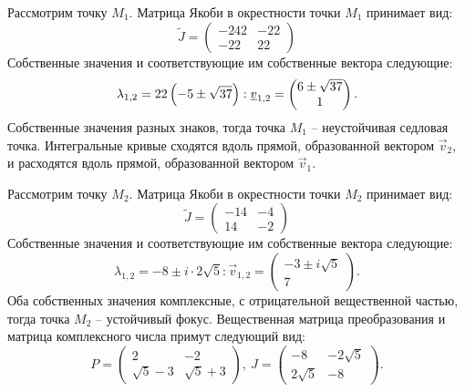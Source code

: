 \begin{enumerate}
				Рассмотрим точку $M_1$. Матрица Якоби в окрестности точки $M_1$ принимает вид:
				\[
					\tilde{J} = \begin{pmatrix}
						-242 & -22 \\
						-22 & 22
					\end{pmatrix}
				\]
				Собственные значения и соответствующие им собственные вектора следующие:
				\[ \lambda_{1, 2} = 22 \left( -5 \pm \sqrt{37} \right): \underline{v}_{1, 2} = \begin{pmatrix} 6 \pm \sqrt{37} \\ 1 \end{pmatrix}. \]
				Собственные значения разных знаков, тогда точка $M_1$ -- неустойчивая седловая точка. Интегральные кривые сходятся вдоль прямой, образованной вектором $\vec{v}_2$, и расходятся вдоль прямой, образованной вектором $\vec{v}_1$.

				Рассмотрим точку $M_2$. Матрица Якоби в окрестности точки $M_2$ принимает вид:
				\[
					\tilde{J} = \begin{pmatrix}
						-14 & -4 \\
						14 & -2
					\end{pmatrix}
				\]
				Собственные значения и соответствующие им собственные вектора следующие:
				\[ \lambda_{1, 2} = -8 \pm i \cdot 2\sqrt{5}: \vec{v}_{1, 2} = \begin{pmatrix} -3 \pm i \sqrt{5} \\ 7 \end{pmatrix}. \]
				Оба собственных значения комплексные, с отрицательной вещественной частью, тогда точка $M_2$ -- устойчивый фокус. Вещественная матрица преобразования и матрица комплексного числа примут следующий вид:
				\[ P = \begin{pmatrix} 2 & -2 \\ \sqrt{5} - 3 & \sqrt{5} + 3 \end{pmatrix}, ~ J = \begin{pmatrix} -8 & -2\sqrt{5} \\ 2\sqrt{5} & -8 \end{pmatrix}. \]


\end{enumerate}
